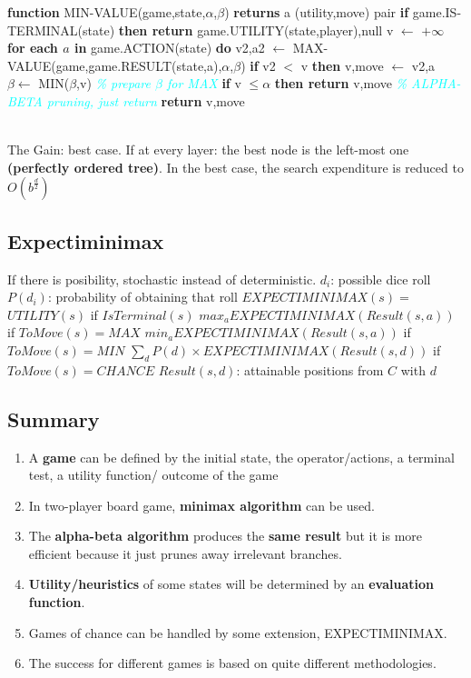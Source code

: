 \tabto{0mm} \textbf{function} MIN-VALUE(game,state,$\alpha$,$\beta$) \textbf{returns} a (utility,move) pair
\tabto{5mm} \textbf{if} game.IS-TERMINAL(state) \textbf{then return} game.UTILITY(state,player),null
\tabto{5mm} v $\leftarrow$ $+ \infty$
\tabto{5mm} \textbf{for each $a$ in} game.ACTION(state) \textbf{do}
\tabto{10mm} v2,a2 $\leftarrow$ MAX-VALUE(game,game.RESULT(state,a),$\alpha$,$\beta$)
\tabto{10mm} \textbf{if} v2 $<$ v \textbf{then}
\tabto{15mm} v,move $\leftarrow$ v2,a
\tabto{15mm} $\beta \leftarrow$ MIN($\beta$,v) \textcolor{cyan}{\emph{\% prepare $\beta$ for MAX}}
\tabto{10mm} \textbf{if} v $\le \alpha$ \textbf{then return} v,move \textcolor{cyan}{\emph{\% ALPHA-BETA pruning, just return}}
\tabto{5mm} \textbf{return} v,move

\noindent
\\ The Gain: best case. If at every layer: the best node is the left-most one \textbf{(perfectly ordered tree)}. In the best case, the search expenditure is reduced to $O(b^{\frac{d}{2}})$

\subsection{Expectiminimax}
If there is posibility, stochastic instead of deterministic.
\tabto{0mm} $d_{i}$: possible dice roll
\tabto{0mm} $P(d_{i})$: probability of obtaining that roll
\tabto{0mm} $EXPECTIMINIMAX(s) = $
\tabto{5mm} $UTILITY(s)$ if $IsTerminal(s)$
\tabto{5mm} $max_{a} EXPECTIMINIMAX(Result(s,a))$ if $ToMove(s) = MAX$
\tabto{5mm} $min_{a} EXPECTIMINIMAX(Result(s,a))$ if $ToMove(s) = MIN$
\tabto{5mm} $\sum_{d} P(d) \times EXPECTIMINIMAX(Result(s,d))$ if $ToMove(s) = CHANCE$
\tabto{0mm} $Result(s,d)$: attainable positions from $C$ with $d$

\subsection{Summary}
\begin{enumerate}
    \item A \textbf{game} can be defined by the initial state, the operator/actions, a terminal test, a utility function/ outcome of the game
    \item In two-player board game, \textbf{minimax algorithm} can be used.
    \item The \textbf{alpha-beta algorithm} produces the \textbf{same result} but it is more efficient because it just prunes away irrelevant branches.
    \item \textbf{Utility/heuristics} of some states will be determined by an \textbf{evaluation function}.
    \item Games of chance can be handled by some extension, EXPECTIMINIMAX.
    \item The success for different games is based on quite different methodologies.
\end{enumerate}

\pagebreak